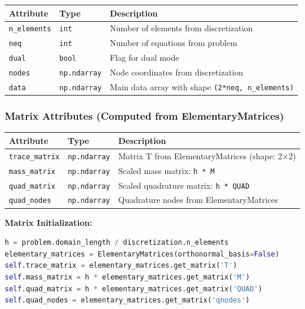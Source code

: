\begin{longtable}{|p{3.5cm}|p{2.5cm}|p{7cm}|}
\hline
\textbf{Attribute} & \textbf{Type} & \textbf{Description} \\
\hline
\endhead

\texttt{n\_elements} & \texttt{int} & Number of elements from discretization \\
\hline

\texttt{neq} & \texttt{int} & Number of equations from problem \\
\hline

\texttt{dual} & \texttt{bool} & Flag for dual  mode \\
\hline

\texttt{nodes} & \texttt{np.ndarray} & Node coordinates from discretization \\
\hline

\texttt{data} & \texttt{np.ndarray} & Main data array with shape \texttt{(2*neq, n\_elements)} \\
\hline

\end{longtable}

\subsubsection{Matrix Attributes (Computed from ElementaryMatrices)}

\begin{longtable}{|p{3.5cm}|p{2.5cm}|p{7cm}|}
\hline
\textbf{Attribute} & \textbf{Type} & \textbf{Description} \\
\hline
\endhead

\texttt{trace\_matrix} & \texttt{np.ndarray} & Matrix T from ElementaryMatrices (shape: 2×2) \\
\hline

\texttt{mass\_matrix} & \texttt{np.ndarray} & Scaled mass matrix: \texttt{h * M} \\
\hline

\texttt{quad\_matrix} & \texttt{np.ndarray} & Scaled quadrature matrix: \texttt{h * QUAD} \\
\hline

\texttt{quad\_nodes} & \texttt{np.ndarray} & Quadrature nodes from ElementaryMatrices \\
\hline

\end{longtable}

\textbf{Matrix Initialization:}
\begin{lstlisting}[language=Python, caption=Matrix Initialization Code]
h = problem.domain_length / discretization.n_elements
elementary_matrices = ElementaryMatrices(orthonormal_basis=False)
self.trace_matrix = elementary_matrices.get_matrix('T')
self.mass_matrix = h * elementary_matrices.get_matrix('M')
self.quad_matrix = h * elementary_matrices.get_matrix('QUAD')
self.quad_nodes = elementary_matrices.get_matrix('qnodes')
\end{lstlisting}

